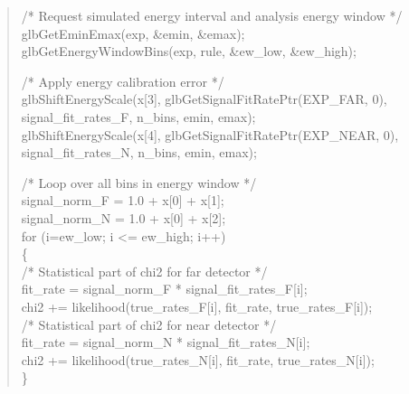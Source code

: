 {\begin{quote}
{   \hspace*{0.3cm} /* Request simulated energy interval and analysis energy window */ \\
   \hspace*{0.3cm} glbGetEminEmax(exp, \&emin, \&emax); \\
   \hspace*{0.3cm} glbGetEnergyWindowBins(exp, rule, \&ew\_low, \&ew\_high); 

  \hspace*{0.3cm} /* Apply energy calibration error */ \\
  \hspace*{0.3cm} glbShiftEnergyScale(x[3], glbGetSignalFitRatePtr(EXP\_FAR, 0), \\
  \hspace*{0.9cm}                    signal\_fit\_rates\_F, n\_bins, emin, emax); \\
  \hspace*{0.3cm} glbShiftEnergyScale(x[4], glbGetSignalFitRatePtr(EXP\_NEAR, 0), \\
  \hspace*{0.9cm}                    signal\_fit\_rates\_N, n\_bins, emin, emax); 

  \hspace*{0.3cm} /* Loop over all bins in energy window */ \\
  \hspace*{0.3cm} signal\_norm\_F = 1.0 + x[0] + x[1]; \\
  \hspace*{0.3cm} signal\_norm\_N = 1.0 + x[0] + x[2]; \\
  \hspace*{0.3cm} for (i=ew\_low; i <= ew\_high; i++) \\
  \hspace*{0.3cm} \{ \\
  \hspace*{0.6cm}  /* Statistical part of chi2 for far detector */ \\
  \hspace*{0.6cm}  fit\_rate  = signal\_norm\_F * signal\_fit\_rates\_F[i]; \\
  \hspace*{0.6cm}  chi2 += likelihood(true\_rates\_F[i], fit\_rate, true\_rates\_F[i]); \\
   
  \hspace*{0.6cm}  /* Statistical part of chi2 for near detector  */ \\
  \hspace*{0.6cm}  fit\_rate  = signal\_norm\_N * signal\_fit\_rates\_N[i]; \\
  \hspace*{0.6cm}  chi2 += likelihood(true\_rates\_N[i], fit\_rate, true\_rates\_N[i]); \\
  \hspace*{0.3cm} \} 

}
\end{quote}}
